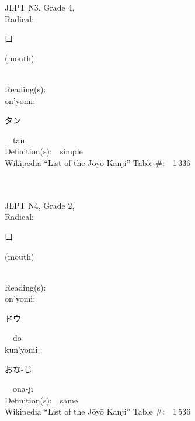 \begin{multicols}{2}
{JLPT N3, Grade 4, \\Radical:\ \ {\begin{CJK}{UTF8}{min} 口 \end{CJK}} (mouth) } \\
Reading(s):\ \ \\
{\hspace*{1em}}on'yomi:\ \ \\
{\hspace*{2em}}{\begin{CJK}{UTF8}{min} タン \end{CJK}}\ \ tan\ \ \\
Definition(s):\ \ simple \\
Wikipedia ``List of the J\=oy\=o Kanji'' Table \#:\ \ 1\,336 \\
\ \ \\
{\fontsize{34pt}{40pt}  }\ \ \\  %
{JLPT N4, Grade 2, \\Radical:\ \ {\begin{CJK}{UTF8}{min} 口 \end{CJK}} (mouth) } \\
Reading(s):\ \ \\
{\hspace*{1em}}on'yomi:\ \ \\
{\hspace*{2em}}{\begin{CJK}{UTF8}{min} ドウ \end{CJK}}\ \ d\=o\ \ \\
{\hspace*{1em}}kun'yomi:\ \ \\
{\hspace*{2em}}{\begin{CJK}{UTF8}{min} おな-じ \end{CJK}}\ \ ona-ji\ \ \\
Definition(s):\ \ same \\
Wikipedia ``List of the J\=oy\=o Kanji'' Table \#:\ \ 1\,536 \\
\ \ \\
{\fontsize{34pt}{40pt}  }\ \ \\  %

\end{multicols}
